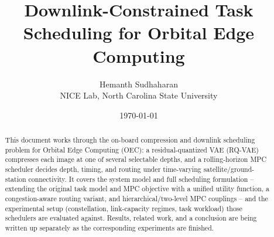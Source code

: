 \documentclass{article}
\title{\textbf{Downlink-Constrained Task Scheduling for Orbital Edge Computing}}
\author{Hemanth Sudhaharan \\ NICE Lab, North Carolina State University}
\date{\today}
\begin{document}
\maketitle

\begin{abstract}
This document works through the on-board compression and downlink
scheduling problem for Orbital Edge Computing (OEC): a residual-quantized
VAE (RQ-VAE) compresses each image at one of several selectable depths,
and a rolling-horizon MPC scheduler decides depth, timing, and routing
under time-varying satellite/ground-station connectivity. It covers the
system model and full scheduling formulation -- extending the original
task model and MPC objective with a unified utility function, a
congestion-aware routing variant, and hierarchical/two-level MPC couplings
-- and the experimental setup (constellation, link-capacity regimes, task
workload) those schedulers are evaluated against. Results, related work,
and a conclusion are being written up separately as the corresponding
experiments are finished.
\end{abstract}





%   
%   
%   
%   
%   
%   
%   
% 
% 
\end{document}
